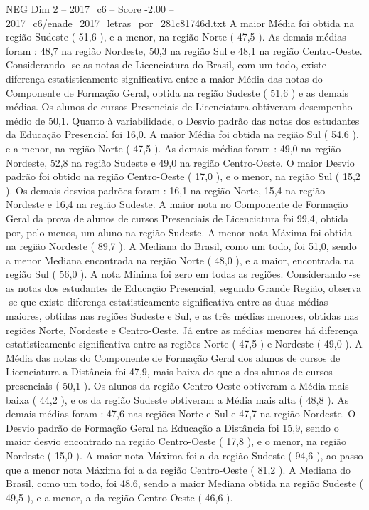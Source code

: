\begin{textsample}{NEG Dim 2 – 2017\_c6 – Score -2.00 – 2017\_c6/enade\_2017\_letras\_por\_281c81746d.txt}
A maior Média foi obtida na região Sudeste ( 51,6 ), e a menor, na região Norte ( 47,5 ).
As demais médias foram : 48,7 na região Nordeste, 50,3 na região Sul e 48,1 na região Centro-Oeste.
Considerando -se as notas de Licenciatura do Brasil, com um todo, existe diferença estatisticamente significativa entre a maior Média das notas do Componente de Formação Geral, obtida na região Sudeste ( 51,6 ) e as demais médias.
Os alunos de cursos Presenciais de Licenciatura obtiveram desempenho médio de 50,1.
Quanto à variabilidade, o Desvio padrão das notas dos estudantes da Educação Presencial foi 16,0.
A maior Média foi obtida na região Sul ( 54,6 ), e a menor, na região Norte ( 47,5 ).
As demais médias foram : 49,0 na região Nordeste, 52,8 na região Sudeste e 49,0 na região Centro-Oeste.
O maior Desvio padrão foi obtido na região Centro-Oeste ( 17,0 ), e o menor, na região Sul ( 15,2 ).
Os demais desvios padrões foram : 16,1 na região Norte, 15,4 na região Nordeste e 16,4 na região Sudeste.
A maior nota no Componente de Formação Geral da prova de alunos de cursos Presenciais de Licenciatura foi 99,4, obtida por, pelo menos, um aluno na região Sudeste.
A menor nota Máxima foi obtida na região Nordeste ( 89,7 ).
A Mediana do Brasil, como um todo, foi 51,0, sendo a menor Mediana encontrada na região Norte ( 48,0 ), e a maior, encontrada na região Sul ( 56,0 ).
A nota Mínima foi zero em todas as regiões.
Considerando -se as notas dos estudantes de Educação Presencial, segundo Grande Região, observa -se que existe diferença estatisticamente significativa entre as duas médias maiores, obtidas nas regiões Sudeste e Sul, e as três médias menores, obtidas nas regiões Norte, Nordeste e Centro-Oeste.
Já entre as médias menores há diferença estatisticamente significativa entre as regiões Norte ( 47,5 ) e Nordeste ( 49,0 ).
A Média das notas do Componente de Formação Geral dos alunos de cursos de Licenciatura a Distância foi 47,9, mais baixa do que a dos alunos de cursos presenciais ( 50,1 ).
Os alunos da região Centro-Oeste obtiveram a Média mais baixa ( 44,2 ), e os da região Sudeste obtiveram a Média mais alta ( 48,8 ).
As demais médias foram : 47,6 nas regiões Norte e Sul e 47,7 na região Nordeste.
O Desvio padrão de Formação Geral na Educação a Distância foi 15,9, sendo o maior desvio encontrado na região Centro-Oeste ( 17,8 ), e o menor, na região Nordeste ( 15,0 ).
A maior nota Máxima foi a da região Sudeste ( 94,6 ), ao passo que a menor nota Máxima foi a da região Centro-Oeste ( 81,2 ).
A Mediana do Brasil, como um todo, foi 48,6, sendo a maior Mediana obtida na região Sudeste ( 49,5 ), e a menor, a da região Centro-Oeste ( 46,6 ).

\end{textsample}
